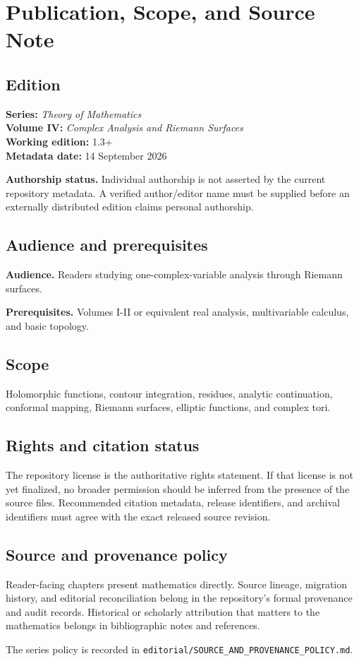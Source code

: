 \chapter*{Publication, Scope, and Source Note}
{}

\section*{Edition}
\textbf{Series:} \emph{Theory of Mathematics}\\
\textbf{Volume IV:} \emph{Complex Analysis and Riemann Surfaces}\\
\textbf{Working edition:} 1.3+\\
\textbf{Metadata date:} 14 September 2026

\textbf{Authorship status.} Individual authorship is not asserted by the current repository metadata. A verified author/editor name must be supplied before an externally distributed edition claims personal authorship.

\section*{Audience and prerequisites}
\textbf{Audience.} Readers studying one-complex-variable analysis through Riemann surfaces.

\textbf{Prerequisites.} Volumes I-II or equivalent real analysis, multivariable calculus, and basic topology.

\section*{Scope}
Holomorphic functions, contour integration, residues, analytic continuation, conformal mapping, Riemann surfaces, elliptic functions, and complex tori.

\section*{Rights and citation status}
The repository license is the authoritative rights statement. If that license is
not yet finalized, no broader permission should be inferred from the presence of
the source files. Recommended citation metadata, release identifiers, and
archival identifiers must agree with the exact released source revision.

\section*{Source and provenance policy}
Reader-facing chapters present mathematics directly. Source lineage, migration
history, and editorial reconciliation belong in the repository's formal
provenance and audit records. Historical or scholarly attribution that matters
to the mathematics belongs in bibliographic notes and references.

The series policy is recorded in
\texttt{editorial/SOURCE\_AND\_PROVENANCE\_POLICY.md}.
